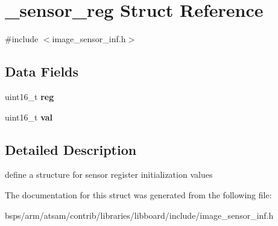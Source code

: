 \hypertarget{struct__sensor__reg}{}\section{\+\_\+sensor\+\_\+reg Struct Reference}
\label{struct__sensor__reg}


{\ttfamily \#include $<$image\+\_\+sensor\+\_\+inf.\+h$>$}

\subsection*{Data Fields}
\begin{DoxyCompactItemize}
\item 
\mbox{\label{struct__sensor__reg_addda70fea1f00ac9927b6659992fd3b4}} 
uint16\+\_\+t {\bfseries reg}
\item 
\mbox{\label{struct__sensor__reg_acf20c72649b1513c74c86243d79a8eb1}} 
uint16\+\_\+t {\bfseries val}
\end{DoxyCompactItemize}


\subsection{Detailed Description}
define a structure for sensor register initialization values 

The documentation for this struct was generated from the following file\+:\begin{DoxyCompactItemize}
\item 
bsps/arm/atsam/contrib/libraries/libboard/include/image\+\_\+sensor\+\_\+inf.\+h\end{DoxyCompactItemize}

